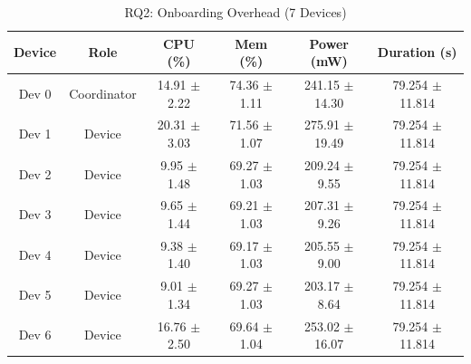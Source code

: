 \begin{table}[htbp]
\centering
\caption{RQ2: Onboarding Overhead (7 Devices)}
\label{tab:RQ2-Device-Overhead-7Nodes-Bootstrap-table}
\begin{tabular}{|c|c|c|c|c|c|}
\hline
\textbf{Device} & \textbf{Role} & \textbf{CPU (\%)} & \textbf{Mem (\%)} & \textbf{Power (mW)} & \textbf{Duration (s)} \\
\hline
Dev 0 & Coordinator & 14.91 $\pm$ 2.22 & 74.36 $\pm$ 1.11 & 241.15 $\pm$ 14.30 & 79.254 $\pm$ 11.814 \\
\hline
Dev 1 & Device & 20.31 $\pm$ 3.03 & 71.56 $\pm$ 1.07 & 275.91 $\pm$ 19.49 & 79.254 $\pm$ 11.814 \\
\hline
Dev 2 & Device & 9.95 $\pm$ 1.48 & 69.27 $\pm$ 1.03 & 209.24 $\pm$ 9.55 & 79.254 $\pm$ 11.814 \\
\hline
Dev 3 & Device & 9.65 $\pm$ 1.44 & 69.21 $\pm$ 1.03 & 207.31 $\pm$ 9.26 & 79.254 $\pm$ 11.814 \\
\hline
Dev 4 & Device & 9.38 $\pm$ 1.40 & 69.17 $\pm$ 1.03 & 205.55 $\pm$ 9.00 & 79.254 $\pm$ 11.814 \\
\hline
Dev 5 & Device & 9.01 $\pm$ 1.34 & 69.27 $\pm$ 1.03 & 203.17 $\pm$ 8.64 & 79.254 $\pm$ 11.814 \\
\hline
Dev 6 & Device & 16.76 $\pm$ 2.50 & 69.64 $\pm$ 1.04 & 253.02 $\pm$ 16.07 & 79.254 $\pm$ 11.814 \\
\hline
\end{tabular}
\end{table}
